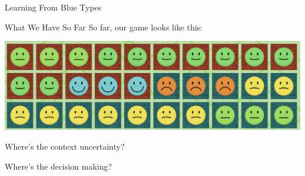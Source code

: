 \documentclass[
  ignorenonframetext,
]{beamer}
\begin{document}
\begin{frame}{Learning From Blue Types}
\begin{figure}
\begin{minipage}[t]{0.14\linewidth}
{{}

}

\end{minipage}%
%
\begin{minipage}[t]{0.14\linewidth}

{\centering 


}

\end{minipage}%

\end{figure}
\end{frame}

\begin{frame}{What We Have So Far}
\protect\hypertarget{what-we-have-so-far}{}
So far, our game looks like this:

\includegraphics{game_halfway.png}

Where's the context uncertainty?

Where's the decision making?
\end{frame}
\end{document}

